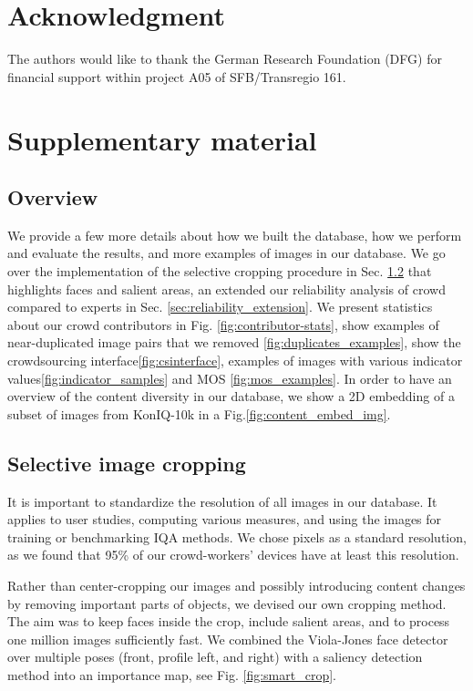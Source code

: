 \documentclass{article}
\begin{document}
\section*{Acknowledgment}
The authors would like to thank the German Research Foundation (DFG) for financial support within project A05 of SFB/Transregio 161. 




\appendix 
\newif\ifsupplementary

\ifsupplementary

\section{Supplementary material}
\subsection{Overview}

We provide a few more details about how we built the database, how we perform and evaluate the results, and more examples of images in our database. We go over the implementation of the selective cropping procedure in Sec. \ref{sec:selective_cropping} that highlights faces and salient areas, an extended our reliability analysis of crowd compared to experts in Sec. \ref{sec:reliability_extension}. We present statistics about our crowd contributors in Fig. \ref{fig:contributor-stats}, show examples of near-duplicated image pairs that we removed \ref{fig:duplicates_examples}, show the crowdsourcing interface\ref{fig:csinterface}, examples of images with various indicator values\ref{fig:indicator_samples} and MOS \ref{fig:mos_examples}.  In order to have an overview of the content diversity in our database, we show a 2D embedding of a subset of images from KonIQ-10k in a Fig.\ref{fig:content_embed_img}.

\subsection{Selective image cropping}
\label{sec:selective_cropping}
It is important to standardize the resolution of all images in our database. It applies to user studies, computing various measures, and using the images for training or benchmarking IQA methods. We chose  pixels as a standard resolution, as we found that 95\% of our crowd-workers' devices have at least this resolution. 



Rather than center-cropping our images and possibly introducing content changes by removing important parts of objects, we devised our own cropping method. The aim was to keep faces inside the crop, include salient areas, and to process one million images sufficiently fast. We combined the Viola-Jones face detector over multiple poses (front, profile left, and right) with a saliency detection method \cite{hou_image_2012} into an importance map, see Fig. \ref{fig:smart_crop}.
\end{document}
